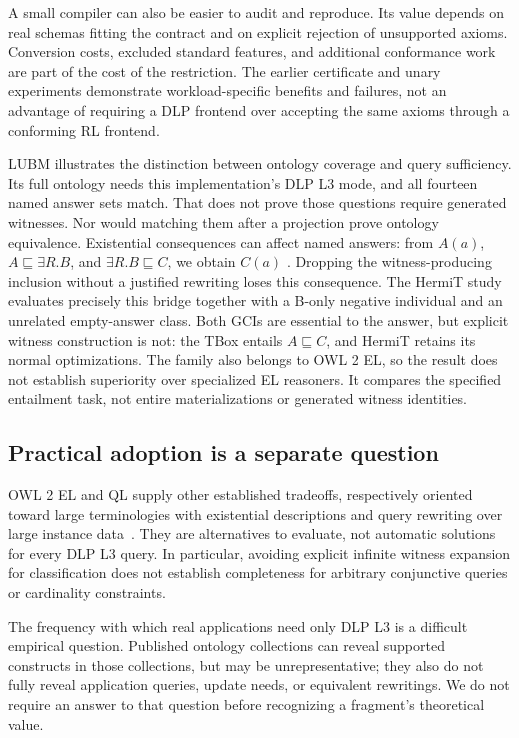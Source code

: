 A small compiler can also be easier to audit and reproduce. Its value depends
on real schemas fitting the contract and on explicit rejection of unsupported
axioms. Conversion costs, excluded standard features, and additional
conformance work are part of the cost of the restriction. The earlier
certificate and unary experiments demonstrate workload-specific benefits and
failures, not an advantage of requiring a DLP frontend over accepting the same
axioms through a conforming RL frontend.

LUBM illustrates the distinction between ontology coverage and query
sufficiency. Its full ontology needs this implementation's DLP L3 mode, and all
fourteen named answer sets match. That does not prove those questions require
generated witnesses. Nor would matching them after a projection prove ontology
equivalence. Existential consequences can affect named answers: from $A(a)$,
$A\sqsubseteq\exists R.B$, and $\exists R.B\sqsubseteq C$, we obtain $C(a)$
\cite{owldirect2012}. Dropping the witness-producing inclusion without a
justified rewriting loses this consequence.
The HermiT study evaluates precisely this bridge together with a B-only
negative individual and an unrelated empty-answer class. Both GCIs are
essential to the answer, but explicit witness construction is not: the TBox
entails $A\sqsubseteq C$, and HermiT retains its normal optimizations. The
family also belongs to OWL 2 EL, so the result does not establish superiority
over specialized EL reasoners. It compares the specified entailment task,
not entire materializations or generated witness identities.

\subsection{Practical adoption is a separate question}
OWL 2 EL and QL supply other established tradeoffs, respectively oriented toward
large terminologies with existential descriptions and query rewriting over
large instance data~\cite{owlprimer2012}. They are alternatives to evaluate,
not automatic solutions for every DLP L3 query. In particular, avoiding explicit
infinite witness expansion for classification does not establish completeness
for arbitrary conjunctive queries or cardinality constraints.

The frequency with which real applications need only DLP L3 is a difficult empirical
question. Published ontology collections can reveal supported constructs in
those collections, but may be unrepresentative; they also do not fully reveal
application queries, update needs, or equivalent rewritings. We do not require
an answer to that question before recognizing a fragment's theoretical value.


